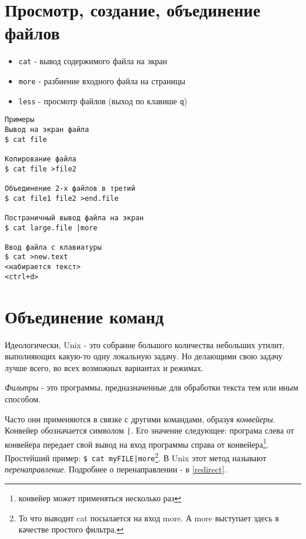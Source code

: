 \section{Просмотр, создание, объединение файлов}

\begin{itemize}
\item \verb+cat+ - вывод содержимого файла на экран 
\item \verb+more+ - разбиение входного файла на страницы
\item \verb+less+ - просмотр файлов (выход по клавише \verb+q+)
\end{itemize}

\begin{verbatim}
Примеры
Вывод на экран файла
$ cat file

Копирование файла
$ cat file >file2

Объединение 2-х файлов в третий
$ cat file1 file2 >end.file

Постраничный вывод файла на экран
$ cat large.file |more 

Ввод файла с клавиатуры
$ cat >new.text
<набирается текст>
<ctrl+d>

\end{verbatim}

\section{Объединение команд} 

Идеологически, Unix - это собрание большого количества небольших утилит, выполняющих какую-то одну локальную задачу. Но делающими свою задачу лучше всего, во всех возможных вариантах и режимах. 

\emph{Фильтры} - это программы, предназначенные для обработки текста тем или иным способом.

Часто они применяются в связке с другими командами, образуя \emph{конвейеры}. Конвейер обозначается символом \verb+|+. Его значение следующее: програма слева от конвейера передает свой вывод на вход программы справа от конвейера\footnote{конвейер может применяться несколько раз}. Простейший пример: \verb+$ cat myFILE|more+\footnote{То что выводит cat посылается на вход more. А more выступает здесь в качестве простого фильтра.}. В Unix этот метод называют \emph{перенаправление}. Подробнее о перенаправлении - в \ref{redirect}.

